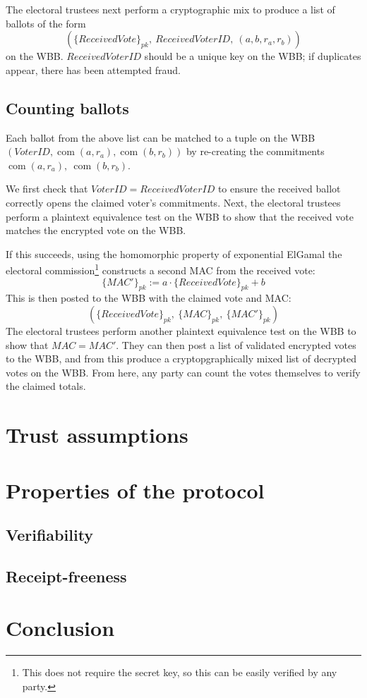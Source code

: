 \documentclass[11pt,twoside,a4paper]{article}
\DeclareMathOperator{\com}{com}
\theoremstyle{definition}
\begin{document}
The electoral trustees next perform a cryptographic mix to produce a list of ballots of the form
\[(\{ReceivedVote\}_{pk},\ ReceivedVoterID,\ (a,b,r_a,r_b))\]
on the WBB. \(ReceivedVoterID\) should be a unique key on the WBB; if duplicates appear, there has been attempted fraud.
\subsection{Counting ballots}
Each ballot from the above list can be matched to a tuple on the WBB \((VoterID, \com(a,r_a), \com(b,r_b))\) by re-creating the commitments \(\com(a,r_a),\ \com(b, r_b)\).

We first check that \(VoterID=ReceivedVoterID\) to ensure the received ballot correctly opens the claimed voter's commitments. Next, the electoral trustees perform a plaintext equivalence test on the WBB to show that the received vote matches the encrypted vote on the WBB.

If this succeeds, using the homomorphic property of exponential ElGamal the electoral commission\footnote{This does not require the secret key, so this can be easily verified by any party.} constructs a second MAC from the received vote:
\[\{MAC'\}_{pk}:=a\cdot\{ReceivedVote\}_{pk}+b\]
This is then posted to the WBB with the claimed vote and MAC:
\[(\{ReceivedVote\}_{pk},\ \{MAC\}_{pk},\ \{MAC'\}_{pk})\]
The electoral trustees perform another plaintext equivalence test on the WBB to show that \(MAC=MAC'\). They can then post a list of validated encrypted votes to the WBB, and from this produce a cryptopgraphically mixed list of decrypted votes on the WBB. From here, any party can count the votes themselves to verify the claimed totals.
\section{Trust assumptions}
\section{Properties of the protocol}\label{sec-properties}
\subsection{Verifiability}
\subsection{Receipt-freeness}
\section{Conclusion}
\vfill\pagebreak
\end{document}
